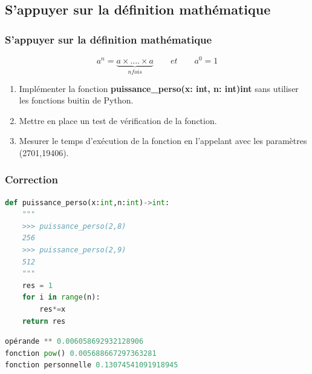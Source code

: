 \documentclass[svgnames,11pt]{beamer}
\begin{document}
\subsection{S'appuyer sur la définition mathématique}
\begin{frame}
    \frametitle{S'appuyer sur la définition mathématique}

    $$a^n=\underbrace{a ×....× a}_{n fois}\qquad et \qquad a^0=1$$
    \begin{activite}
    \begin{enumerate}
    \item Implémenter la fonction \textbf{puissance\_perso(x: int, n: int)\;\rightarrow\;int} sans utiliser les fonctions buitin de Python.
    \item Mettre en place un test de vérification de la fonction.
    \item Mesurer le temps d'exécution de la fonction en l'appelant avec les paramètres (2701,19406).
    \end{enumerate}
    \end{activite}

\end{frame}
\begin{frame}[fragile]
    \frametitle{Correction}

\begin{center}
\begin{lstlisting}[language=Python , basicstyle=\ttfamily\small, xleftmargin=2em, xrightmargin=2em]
def puissance_perso(x:int,n:int)->int:
    """
    >>> puissance_perso(2,8)
    256
    >>> puissance_perso(2,9)
    512
    """
    res = 1
    for i in range(n):
        res*=x
    return res
\end{lstlisting}
\end{center}
\begin{center}
\begin{lstlisting}[language=Python , basicstyle=\ttfamily\small, xleftmargin=2em, xrightmargin=2em]
opérande ** 0.006058692932128906
fonction pow() 0.005688667297363281
fonction personnelle 0.13074541091918945
\end{lstlisting}
\label{CODE}
\end{center}
\end{frame}
\end{document}
